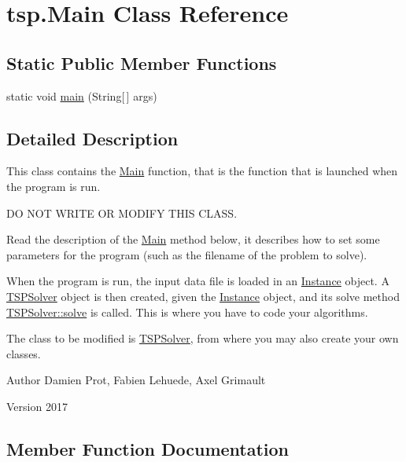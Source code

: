 \hypertarget{classtsp_1_1_main}{}\section{tsp.\+Main Class Reference}
\label{classtsp_1_1_main}
\subsection*{Static Public Member Functions}
\begin{DoxyCompactItemize}
\item 
static void \mbox{\hyperlink{classtsp_1_1_main_a84c085f37861f74d26600c5c5f0c29b0}{main}} (String\mbox{[}$\,$\mbox{]} args)
\end{DoxyCompactItemize}


\subsection{Detailed Description}
This class contains the \mbox{\hyperlink{classtsp_1_1_main}{Main}} function, that is the function that is launched when the program is run.

DO N\+OT W\+R\+I\+TE OR M\+O\+D\+I\+FY T\+H\+IS C\+L\+A\+SS.

Read the description of the \mbox{\hyperlink{classtsp_1_1_main}{Main}} method below, it describes how to set some parameters for the program (such as the filename of the problem to solve).

When the program is run, the input data file is loaded in an \mbox{\hyperlink{classtsp_1_1_instance}{Instance}} object. A \mbox{\hyperlink{classtsp_1_1_t_s_p_solver}{T\+S\+P\+Solver}} object is then created, given the \mbox{\hyperlink{classtsp_1_1_instance}{Instance}} object, and its solve method \mbox{\hyperlink{classtsp_1_1_t_s_p_solver_a9d4e4f4559a537b2af395fb8ab930906}{T\+S\+P\+Solver\+::solve}} is called. This is where you have to code your algorithms.

The class to be modified is \mbox{\hyperlink{classtsp_1_1_t_s_p_solver}{T\+S\+P\+Solver}}, from where you may also create your own classes.

\begin{DoxyAuthor}{Author}
Damien Prot, Fabien Lehuede, Axel Grimault 
\end{DoxyAuthor}
\begin{DoxyVersion}{Version}
2017 
\end{DoxyVersion}


\subsection{Member Function Documentation}
\mbox{\label{classtsp_1_1_main_a84c085f37861f74d26600c5c5f0c29b0}} 
